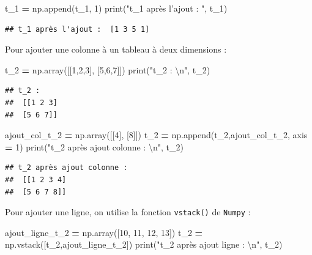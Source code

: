 \documentclass[12pt,]{book}
\newenvironment{Shaded}{\begin{snugshade}}{\end{snugshade}}
\newcommand{\DecValTok}[1]{\textcolor[rgb]{0.00,0.00,0.81}{#1}}
\newcommand{\CharTok}[1]{\textcolor[rgb]{0.31,0.60,0.02}{#1}}
\newcommand{\StringTok}[1]{\textcolor[rgb]{0.31,0.60,0.02}{#1}}
\newcommand{\OperatorTok}[1]{\textcolor[rgb]{0.81,0.36,0.00}{\textbf{#1}}}
\newcommand{\BuiltInTok}[1]{#1}
\newcommand{\NormalTok}[1]{#1}
\numberwithin{equation}{section}
\numberwithin{countremarque}{section}
\begin{document}
\begin{Shaded}
\begin{Highlighting}[]
\NormalTok{t_1 }\OperatorTok{=}\NormalTok{ np.append(t_1, }\DecValTok{1}\NormalTok{)}
\BuiltInTok{print}\NormalTok{(}\StringTok{"t_1 après l'ajout : "}\NormalTok{, t_1)}
\end{Highlighting}
\end{Shaded}

\begin{lstlisting}
## t_1 après l'ajout :  [1 3 5 1]
\end{lstlisting}

Pour ajouter une colonne à un tableau à deux dimensions :

\begin{Shaded}
\begin{Highlighting}[]
\NormalTok{t_2 }\OperatorTok{=}\NormalTok{ np.array([[}\DecValTok{1}\NormalTok{,}\DecValTok{2}\NormalTok{,}\DecValTok{3}\NormalTok{], [}\DecValTok{5}\NormalTok{,}\DecValTok{6}\NormalTok{,}\DecValTok{7}\NormalTok{]])}
\BuiltInTok{print}\NormalTok{(}\StringTok{"t_2 : }\CharTok{\textbackslash{}n}\StringTok{"}\NormalTok{, t_2)}
\end{Highlighting}
\end{Shaded}

\begin{lstlisting}
## t_2 : 
##  [[1 2 3]
##  [5 6 7]]
\end{lstlisting}

\begin{Shaded}
\begin{Highlighting}[]
\NormalTok{ajout_col_t_2 }\OperatorTok{=}\NormalTok{ np.array([[}\DecValTok{4}\NormalTok{], [}\DecValTok{8}\NormalTok{]])}
\NormalTok{t_2 }\OperatorTok{=}\NormalTok{ np.append(t_2,ajout_col_t_2, axis }\OperatorTok{=} \DecValTok{1}\NormalTok{)}
\BuiltInTok{print}\NormalTok{(}\StringTok{"t_2 après ajout colonne : }\CharTok{\textbackslash{}n}\StringTok{"}\NormalTok{, t_2)}
\end{Highlighting}
\end{Shaded}

\begin{lstlisting}
## t_2 après ajout colonne : 
##  [[1 2 3 4]
##  [5 6 7 8]]
\end{lstlisting}

Pour ajouter une ligne, on utilise la fonction \texttt{vstack()} de
\texttt{Numpy} :

\begin{Shaded}
\begin{Highlighting}[]
\NormalTok{ajout_ligne_t_2 }\OperatorTok{=}\NormalTok{ np.array([}\DecValTok{10}\NormalTok{, }\DecValTok{11}\NormalTok{, }\DecValTok{12}\NormalTok{, }\DecValTok{13}\NormalTok{])}
\NormalTok{t_2 }\OperatorTok{=}\NormalTok{ np.vstack([t_2,ajout_ligne_t_2])}
\BuiltInTok{print}\NormalTok{(}\StringTok{"t_2 après ajout ligne : }\CharTok{\textbackslash{}n}\StringTok{"}\NormalTok{, t_2)}
\end{Highlighting}
\end{Shaded}
\end{document}
